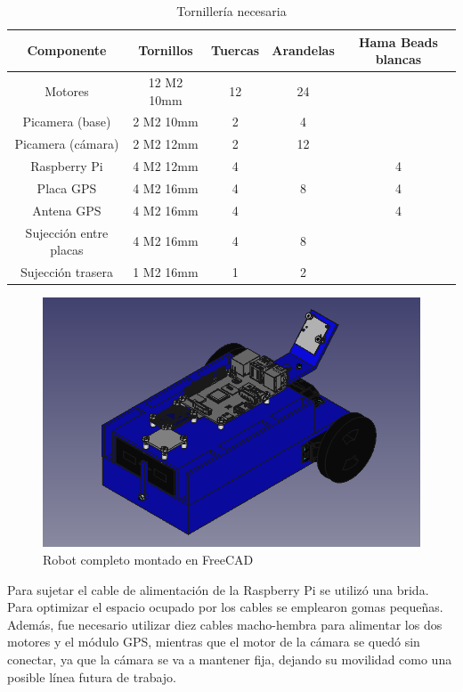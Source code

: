 \begin{table}[H]
	\begin{center}
		\begin{tabular}{|c|c|c|c|c|}
			\hline
			Componente & Tornillos & Tuercas & Arandelas & Hama Beads blancas\\
			\hline
			Motores & 12 M2 10mm & 12 & 24 &\\
			\hline
			Picamera (base) & 2 M2 10mm & 2 & 4 &\\
			\hline
			Picamera (cámara) & 2 M2 12mm & 2 & 12 &\\
			\hline
			Raspberry Pi & 4 M2 12mm & 4 & & 4\\
			\hline
			Placa GPS & 4 M2 16mm & 4 & 8 & 4\\
			\hline
			Antena GPS & 4 M2 16mm & 4 & & 4\\
			\hline
			Sujección entre placas & 4 M2 16mm & 4 & 8 &\\
			\hline
			Sujección trasera & 1 M2 16mm & 1 & 2 &\\
			\hline
		\end{tabular}
		\caption{Tornillería necesaria}
		\label{cuadro:tornillos}
	\end{center}
\end{table}

\begin{figure} [h!]
	\begin{center}
		\includegraphics[width=12cm]{figs/cap5/completo3.png}
	\end{center}
	\caption{Robot completo montado en FreeCAD} 
	\label{fig:robotfreecad}
\end{figure}


Para sujetar el cable de alimentación de la Raspberry Pi se utilizó una brida. Para optimizar el espacio ocupado por los cables se emplearon gomas pequeñas. Además, fue necesario utilizar diez cables macho-hembra para alimentar los dos motores y el módulo GPS, mientras que el motor de la cámara se quedó sin conectar, ya que la cámara se va a mantener fija, dejando su movilidad como una posible línea futura de trabajo.

